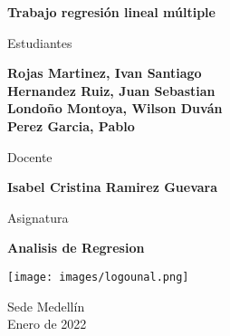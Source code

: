 \begin{titlepage}
   \Large{
   \begin{center}
       \vspace*{1cm}

       \textbf{Trabajo regresión lineal múltiple}

            
       \vspace{1cm}
       
       Estudiantes
       
       \vspace{0.5cm}
        
        
       \textbf{Rojas Martinez, Ivan Santiago} \\
       \textbf{Hernandez Ruiz, Juan Sebastian} \\
       \textbf{Londoño Montoya, Wilson Duván} \\
       \textbf{Perez Garcia, Pablo} \\
       
              \vspace{1cm}
       
       Docente
       
       \vspace{0.5cm}

       \textbf{Isabel Cristina Ramirez Guevara}
       
       \vspace{0.4cm}

       \vspace{1.5cm}
       
       Asignatura
       
       \vspace{0.5cm}

       \textbf{Analisis de Regresion}

       \vfill

            
       \vspace{0.1cm}
     
       \texttt{[image: images/logounal.png]}
            
       Sede Medellín\\
       Enero de 2022
       
   \end{center}
   }
\end{titlepage}